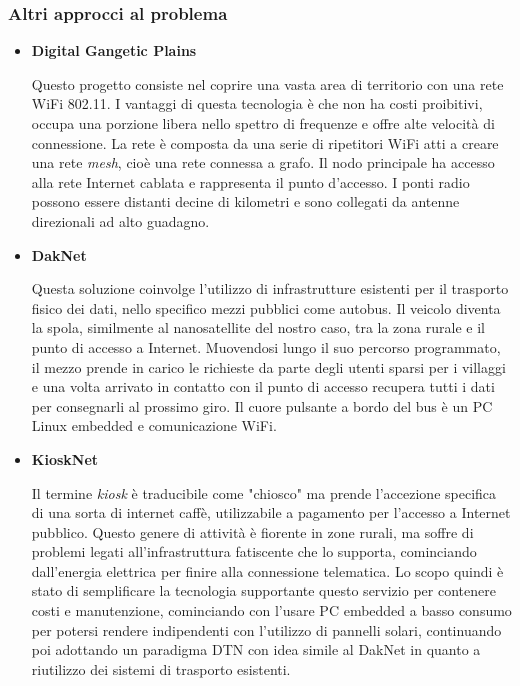 \documentclass[a4paper]{article}
\begin{document}
			\subsubsection{Altri approcci al problema}
			
			\begin{itemize}
				\item {\bf Digital Gangetic Plains \cite{raman2007experiences}}
				
				Questo progetto consiste nel coprire una vasta area di territorio con una rete WiFi 802.11. I vantaggi di questa tecnologia è che non ha costi proibitivi, occupa una porzione libera nello spettro di frequenze e offre alte velocità di connessione. La rete è composta da una serie di ripetitori WiFi atti a creare una rete {\it mesh}, cioè una rete connessa a grafo. Il nodo principale ha accesso alla rete Internet cablata e rappresenta il punto d'accesso. I ponti radio possono essere distanti decine di kilometri e sono collegati da antenne direzionali ad alto guadagno. 
				
				\item {\bf DakNet \cite{hasson2003daknet}}
				
				Questa soluzione coinvolge l'utilizzo di infrastrutture esistenti per il trasporto fisico dei dati, nello specifico mezzi pubblici come autobus. Il veicolo diventa la spola, similmente al nanosatellite del nostro caso, tra la zona rurale e il punto di accesso a Internet. Muovendosi lungo il suo percorso programmato, il mezzo prende in carico le richieste da parte degli utenti sparsi per i villaggi e una volta arrivato in contatto con il punto di accesso recupera tutti i dati per consegnarli al prossimo giro. Il cuore pulsante a bordo del bus è un PC Linux embedded e comunicazione WiFi. 
				
				\item {\bf KioskNet \cite{seth2006low}}
				
				Il termine {\it kiosk} è traducibile come "chiosco" ma prende l'accezione specifica di una sorta di internet caffè, utilizzabile a pagamento per l'accesso a Internet pubblico. Questo genere di attività è fiorente in zone rurali, ma soffre di problemi legati all'infrastruttura fatiscente che lo supporta, cominciando dall'energia elettrica per finire alla connessione telematica. Lo scopo quindi è stato di semplificare la tecnologia supportante questo servizio per contenere costi e manutenzione, cominciando con l'usare PC embedded a basso consumo per potersi rendere indipendenti con l'utilizzo di pannelli solari, continuando poi adottando un paradigma DTN con idea simile al DakNet in quanto a riutilizzo dei sistemi di trasporto esistenti.
								
			\end{itemize}
			
\end{document}
